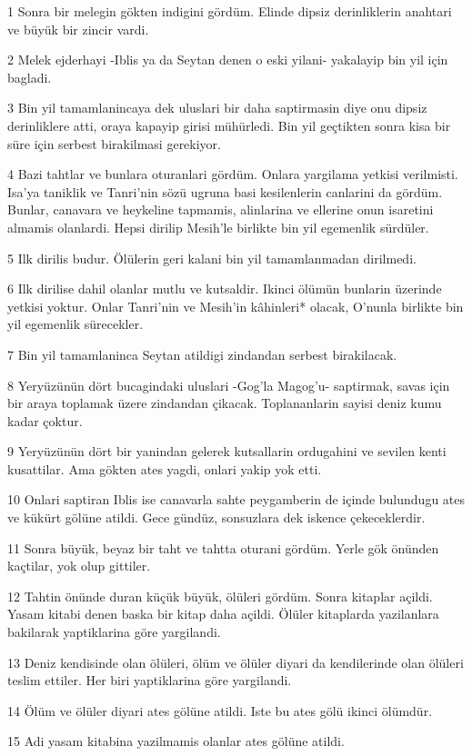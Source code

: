\par 1 Sonra bir melegin gökten indigini gördüm. Elinde dipsiz derinliklerin anahtari ve büyük bir zincir vardi.
\par 2 Melek ejderhayi -Iblis ya da Seytan denen o eski yilani- yakalayip bin yil için bagladi.
\par 3 Bin yil tamamlanincaya dek uluslari bir daha saptirmasin diye onu dipsiz derinliklere atti, oraya kapayip girisi mühürledi. Bin yil geçtikten sonra kisa bir süre için serbest birakilmasi gerekiyor.
\par 4 Bazi tahtlar ve bunlara oturanlari gördüm. Onlara yargilama yetkisi verilmisti. Isa'ya taniklik ve Tanri'nin sözü ugruna basi kesilenlerin canlarini da gördüm. Bunlar, canavara ve heykeline tapmamis, alinlarina ve ellerine onun isaretini almamis olanlardi. Hepsi dirilip Mesih'le birlikte bin yil egemenlik sürdüler.
\par 5 Ilk dirilis budur. Ölülerin geri kalani bin yil tamamlanmadan dirilmedi.
\par 6 Ilk dirilise dahil olanlar mutlu ve kutsaldir. Ikinci ölümün bunlarin üzerinde yetkisi yoktur. Onlar Tanri'nin ve Mesih'in kâhinleri* olacak, O'nunla birlikte bin yil egemenlik sürecekler.
\par 7 Bin yil tamamlaninca Seytan atildigi zindandan serbest birakilacak.
\par 8 Yeryüzünün dört bucagindaki uluslari -Gog'la Magog'u- saptirmak, savas için bir araya toplamak üzere zindandan çikacak. Toplananlarin sayisi deniz kumu kadar çoktur.
\par 9 Yeryüzünün dört bir yanindan gelerek kutsallarin ordugahini ve sevilen kenti kusattilar. Ama gökten ates yagdi, onlari yakip yok etti.
\par 10 Onlari saptiran Iblis ise canavarla sahte peygamberin de içinde bulundugu ates ve kükürt gölüne atildi. Gece gündüz, sonsuzlara dek iskence çekeceklerdir.
\par 11 Sonra büyük, beyaz bir taht ve tahtta oturani gördüm. Yerle gök önünden kaçtilar, yok olup gittiler.
\par 12 Tahtin önünde duran küçük büyük, ölüleri gördüm. Sonra kitaplar açildi. Yasam kitabi denen baska bir kitap daha açildi. Ölüler kitaplarda yazilanlara bakilarak yaptiklarina göre yargilandi.
\par 13 Deniz kendisinde olan ölüleri, ölüm ve ölüler diyari da kendilerinde olan ölüleri teslim ettiler. Her biri yaptiklarina göre yargilandi.
\par 14 Ölüm ve ölüler diyari ates gölüne atildi. Iste bu ates gölü ikinci ölümdür.
\par 15 Adi yasam kitabina yazilmamis olanlar ates gölüne atildi.

